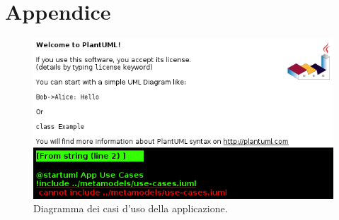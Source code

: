\section{Appendice}

\begin{figure}[H]
    \centering
    \includegraphics[width=\textwidth]{uml/app-use-case.png}
    \caption{Diagramma dei casi d'uso della applicazione.}
    \label{fig:app-use-case}
\end{figure}

